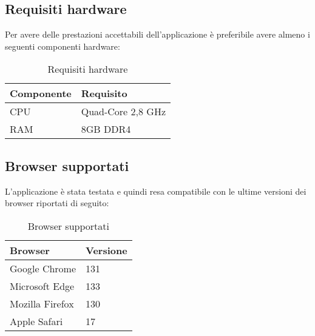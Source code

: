 \subsection{Requisiti hardware}

Per avere delle prestazioni accettabili dell’applicazione è preferibile avere almeno i seguenti
componenti hardware:

\begin{table}[h!]
    \centering
    \renewcommand{\arraystretch}{1.6} %
    \begin{tabularx}{0.5\textwidth}{|p{4cm}|X|} \hline
    \rowcolor[HTML]{FFD700} 
    \textbf{Componente} & \textbf{Requisito} \\ 
    \hline
    CPU & Quad-Core 2,8 GHz \\ 
    \hline
    RAM & 8GB DDR4 \\ 
    \hline
    \end{tabularx}
    \caption{Requisiti hardware}
\end{table}


\subsection{Browser supportati}

L’applicazione è stata testata e quindi resa compatibile con le ultime versioni dei browser
riportati di seguito:

\newpage

\begin{table}[h!]
    \centering
    \renewcommand{\arraystretch}{1.6} %
    \begin{tabularx}{0.5\textwidth}{|p{4cm}|X|} \hline
    \rowcolor[HTML]{FFD700} 
    \textbf{Browser} & \textbf{Versione} \\ 
    \hline
    Google Chrome & 131 \\ 
    \hline
    Microsoft Edge & 133 \\ 
    \hline
    Mozilla Firefox & 130 \\
    \hline
    Apple Safari & 17 \\
    \hline
    \end{tabularx}
    \caption{Browser supportati}
\end{table}
